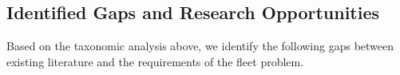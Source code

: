 \documentclass[11pt,a4paper]{article}
\theoremstyle{plain}
\theoremstyle{definition}
\theoremstyle{remark}
\begin{document}
\subsection{Identified Gaps and Research Opportunities}
\label{sec:framing:gaps}

Based on the taxonomic analysis above, we identify the following gaps between
existing literature and the requirements of the fleet problem.

\end{document}
